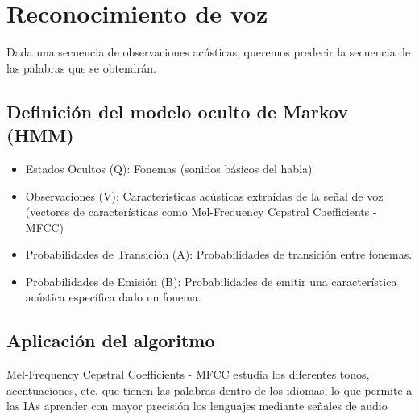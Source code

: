 \documentclass[11pt,openany]{book}
\begin{document}
\section{Reconocimiento de voz}

Dada una secuencia de observaciones acústicas, queremos predecir la secuencia de las palabras que se obtendrán.
\subsection*{Definición del modelo oculto de Markov (HMM)}
      \begin{itemize}
            \item  Estados Ocultos (Q): Fonemas (sonidos básicos del habla)
            \item  Observaciones (V): Características acústicas extraídas de la señal de voz (vectores de características como Mel-Frequency Cepstral Coefficients - MFCC)
            \item  Probabilidades de Transición (A): Probabilidades de transición entre fonemas.
            \item  Probabilidades de Emisión (B): Probabilidades de emitir una característica acústica específica dado un fonema.
      \end{itemize}
\subsection*{Aplicación del algoritmo}  
    Mel-Frequency Cepstral Coefficients - MFCC estudia los diferentes tonos, acentuaciones, etc. que tienen las palabras dentro de los idiomas, lo que permite a las IAs aprender
    con mayor precisión los lenguajes mediante señales de audio
\end{document}
